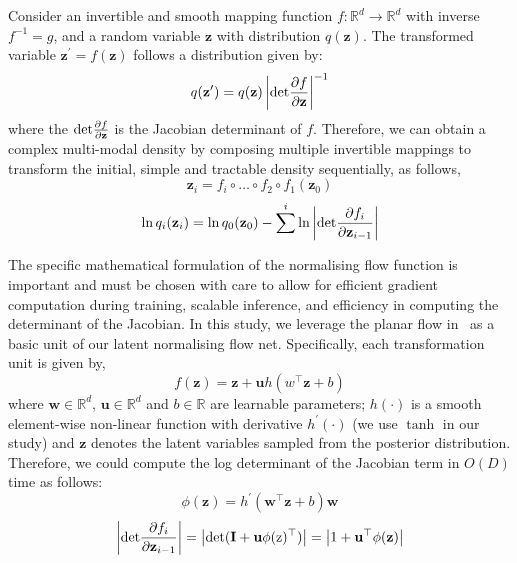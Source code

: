\documentclass[runningheads]{llncs}
\begin{document}
Consider an invertible and smooth mapping function $f: \mathbb{R}^{d} \rightarrow \mathbb{R}^{d}$ with inverse $f^{-1}=g$, and a random variable $\textbf{z}$ with distribution $q(\textbf{z})$. The transformed variable $\textbf{z}^{\prime}=f(\textbf{z})$ follows a distribution given by: 
\begin{equation}
    q( \textbf{z}^{\prime}) = q(\textbf{z}) \left\vert {\rm det} \frac{\partial f}{\partial \textbf{z}}  \right\vert^{-1}
\end{equation}
where the ${\rm det} \frac{\partial f}{\partial \textbf{z}}$ is the Jacobian determinant of $f$. Therefore, we can obtain a complex multi-modal density by composing multiple invertible mappings to transform the initial, simple and tractable density sequentially, as follows,
\begin{equation}
    \textbf{z}_{i} = f_{i}\circ \dots \circ f_{2} \circ f_{1}(\textbf{z}_{0})
\end{equation}
\begin{equation}
\label{equ:lnqz}
    \ln q_{i}(\textbf{z}_{i}) = \ln q_{0}(\textbf{z}_{0}) - \sum^{i} \ln \left\vert {\rm det} \frac{\partial f_{i}}{\partial \textbf{z}_{i-1}} \right\vert
\end{equation}

The specific mathematical formulation of the normalising flow function is important and must be chosen with care to allow for efficient gradient computation during training, scalable inference, and efficiency in computing the determinant of the Jacobian. In this study, we leverage the planar flow in~\cite{rezende2015variational} as a basic unit of our latent normalising flow net. Specifically, each transformation unit is given by,
\begin{equation}
    f(\textbf{z}) = \textbf{z} + \textbf{u} h(w^{\top}\textbf{z} + b)
\end{equation}
where $\textbf{w} \in \mathbb{R}^d$, $\textbf{u} \in \mathbb{R}^d$ and $b\in \mathbb{R}$ are learnable parameters; $h(\cdot)$ is a smooth element-wise non-linear function with derivative $h^{\prime}(\cdot)$ (we use $\tanh$ in our study) and $\mathbf{z}$ denotes the latent variables sampled from the posterior distribution. Therefore, we could compute the log determinant of the Jacobian term in $O(D)$ time as follows:
\begin{equation}
    \phi(\textbf{z}) = h^{\prime}( \textbf{w}^{\top} \textbf{z}+b) \textbf{w}
\end{equation}
\begin{equation}
    \left\vert {\rm det} \frac{\partial f_{i}}{\partial \textbf{z}_{i-1}} \right\vert = \left\vert \rm{det}(\textbf{I} + \textbf{u} \phi(z)^{\top}) \right\vert = \left\vert 1+\textbf{u}^{\top}\phi(\textbf{z}) \right\vert
\end{equation}
\end{document}
